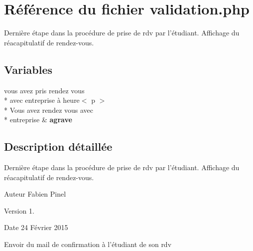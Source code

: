\hypertarget{validation_8php}{\section{Référence du fichier validation.\-php}
\label{validation_8php}
}


Dernière étape dans la procédure de prise de rdv par l'étudiant. Affichage du réacapitulatif de rendez-\/vous.  


\subsection*{Variables}
\begin{DoxyCompactItemize}
\item 
\hypertarget{validation_8php_a39ac5f8ea47cff398fe44dac4307c842}{vous avez pris rendez vous \\*
avec entreprise à heure$<$ p $>$\\*
 Vous avez rendez vous avec \\*
entreprise \& {\bfseries agrave}}\label{validation_8php_a39ac5f8ea47cff398fe44dac4307c842}

\end{DoxyCompactItemize}


\subsection{Description détaillée}
Dernière étape dans la procédure de prise de rdv par l'étudiant. Affichage du réacapitulatif de rendez-\/vous. \begin{DoxyAuthor}{Auteur}
Fabien Pinel 
\end{DoxyAuthor}
\begin{DoxyVersion}{Version}
1. 
\end{DoxyVersion}
\begin{DoxyDate}{Date}
24 Février 2015
\end{DoxyDate}
Envoir du mail de confirmation à l'étudiant de son rdv 